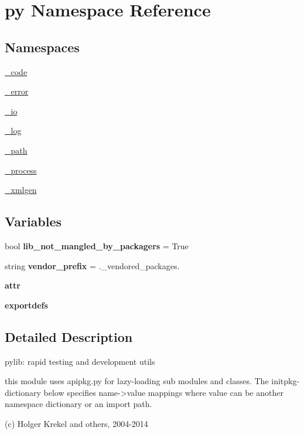 \hypertarget{namespacepy}{}\section{py Namespace Reference}
\label{namespacepy}
\subsection*{Namespaces}
\begin{DoxyCompactItemize}
\item 
 \hyperlink{namespacepy_1_1__code}{\+\_\+code}
\item 
 \hyperlink{namespacepy_1_1__error}{\+\_\+error}
\item 
 \hyperlink{namespacepy_1_1__io}{\+\_\+io}
\item 
 \hyperlink{namespacepy_1_1__log}{\+\_\+log}
\item 
 \hyperlink{namespacepy_1_1__path}{\+\_\+path}
\item 
 \hyperlink{namespacepy_1_1__process}{\+\_\+process}
\item 
 \hyperlink{namespacepy_1_1__xmlgen}{\+\_\+xmlgen}
\end{DoxyCompactItemize}
\subsection*{Variables}
\begin{DoxyCompactItemize}
\item 
\mbox{\label{namespacepy_aadc2d7720d66e8ec28cfd004fe95d3a4}} 
bool {\bfseries lib\+\_\+not\+\_\+mangled\+\_\+by\+\_\+packagers} = True
\item 
\mbox{\label{namespacepy_a3dc40b62adbc002ffcdadd94f52fae35}} 
string {\bfseries vendor\+\_\+prefix} = \textquotesingle{}.\+\_\+vendored\+\_\+packages.\textquotesingle{}
\item 
\mbox{\label{namespacepy_ad962d43974503f0c49565c5f06fdbce9}} 
{\bfseries attr}
\item 
\mbox{\label{namespacepy_ac4f32d48daf638d4e5a65c83a68b4592}} 
{\bfseries exportdefs}
\end{DoxyCompactItemize}


\subsection{Detailed Description}
\begin{DoxyVerb}pylib: rapid testing and development utils

this module uses apipkg.py for lazy-loading sub modules
and classes.  The initpkg-dictionary  below specifies
name->value mappings where value can be another namespace
dictionary or an import path.

(c) Holger Krekel and others, 2004-2014
\end{DoxyVerb}
 